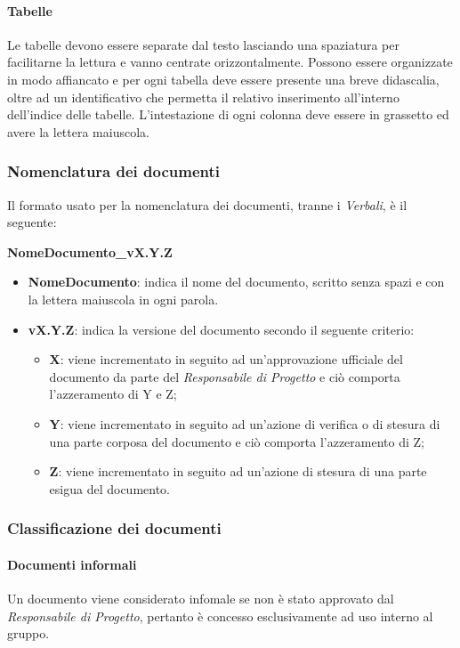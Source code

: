 \paragraph{Tabelle} \Spazio
Le tabelle devono essere separate dal testo lasciando una spaziatura per facilitarne la lettura e vanno centrate orizzontalmente. Possono essere organizzate in modo affiancato e per ogni tabella deve essere presente una breve didascalia, oltre ad un identificativo che permetta il relativo inserimento all’interno dell’indice delle
tabelle. L'intestazione di ogni colonna deve essere in grassetto ed avere la lettera maiuscola.


\subsubsection{Nomenclatura dei documenti}
Il formato usato per la nomenclatura dei documenti, tranne i \emph{Verbali}, è il seguente: \Spazio \centerline{\textbf{NomeDocumento\_vX.Y.Z}}
\begin{itemize}
	\item \textbf{NomeDocumento}: indica il nome del documento, scritto senza spazi e con la lettera maiuscola in ogni parola.
	\item \textbf{vX.Y.Z}: indica la versione del documento secondo il seguente criterio:
	\begin{itemize}
		\item \textbf{X}: viene incrementato in seguito ad un'approvazione ufficiale del documento da parte del \emph{Responsabile di Progetto} e ciò comporta l'azzeramento di Y e Z;
		\item \textbf{Y}: viene incrementato in seguito ad un'azione di verifica o di stesura di una parte corposa del documento e ciò comporta l'azzeramento di Z;
		\item \textbf{Z}: viene incrementato in seguito ad un'azione di stesura di una parte esigua del documento.
	\end{itemize}
\end{itemize}

\subsubsection{Classificazione dei documenti}
\paragraph{Documenti informali} \Spazio 
Un documento viene considerato infomale se non è stato approvato dal \emph{Responsabile di Progetto}, pertanto è concesso esclusivamente ad uso interno al gruppo.


